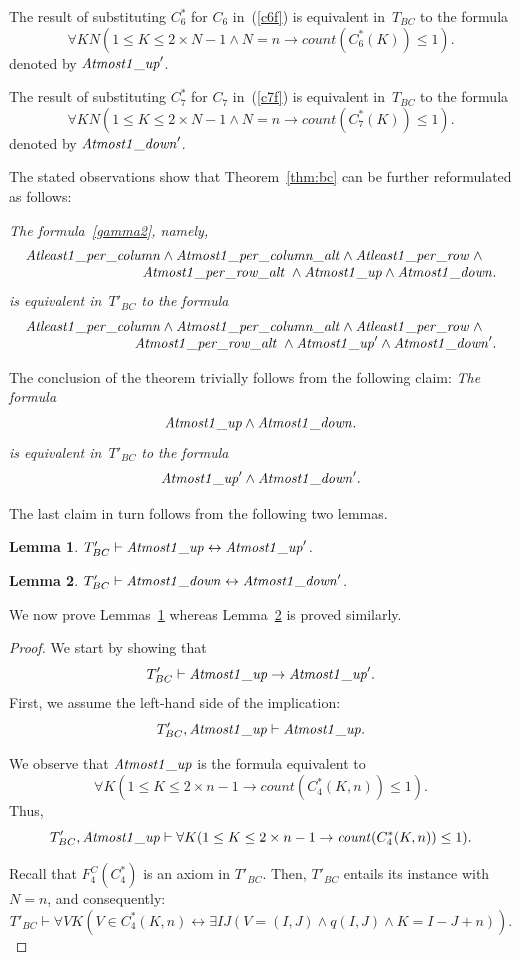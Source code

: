 \documentclass[11pt]{article}
\newtheorem{lemma}{Lemma}
\def\lrar{\leftrightarrow}
\def\beq{\begin{equation}}
\def\eeq#1{\label{#1}\end{equation}}
\def\ba{\begin{array}}
\def\ea{\end{array}}
\newcommand{\co}{\ensuremath{\mathit{count}}}
\def\bTwofgeq{\mathit{Atleast1\_per\_column\/}}
\def\bTwofleq{\mathit{Atmost1\_per\_column\_alt\/}}
\def\bThreefgeq{\mathit{Atleast1\_per\_row\/}}
\def\bThreefleq{\mathit{Atmost1\_per\_row\_alt\/}}
\def\bFourfs{\mathit{Atmost1\_up\/}}
\def\bFivefs{\mathit{Atmost1\_down\/}}
\begin{document}
\begin{adjustwidth}{-1cm}{-1cm}
The result of substituting $C_6^*$ for $C_6$ in~(\ref{c6f}) is equivalent
in~$T_{BC}$ to the formula
$$
\forall KN
(1\leq K\leq 2\times N-1 \land N=n\to\co(C^*_6(K))\leq 1).
$$
denoted by $\bFourfs'$.

The result of substituting $C_7^*$ for $C_7$ in~(\ref{c7f}) is equivalent
in~$T_{BC}$ to the formula
$$
\forall KN
(1\leq K\leq 2\times N-1
\land N=n\to
\co(C^*_7(K))\leq 1).
$$
denoted by $\bFivefs'$.


\medskip
The stated observations  show that Theorem~\ref{thm:bc} can be further
reformulated as follows:

\medskip{}
\emph{The formula~\eqref{gamma2}, namely,
$$
\ba r
\bTwofgeq\land \bTwofleq\land \bThreefgeq\;\land\quad\\
\bThreefleq\;\land\bFourfs\land \bFivefs.
\ea
$$%
is equivalent in~$T'_{BC}$ to the formula
$$
\ba r
\bTwofgeq\land \bTwofleq\land \bThreefgeq\;\land\quad\\
\bThreefleq\;\land\bFourfs'\land \bFivefs'.
\ea
$$%
}

\medskip
The conclusion of the theorem trivially follows from the following claim:
\emph{The formula
$$
\ba r
\bFourfs\land \bFivefs.
\ea
$$%
is equivalent in~$T'_{BC}$ to the formula
$$
\ba r
\bFourfs'\land \bFivefs'.
\ea
$$
}

\noindent
The last claim in turn follows from the following two lemmas.
\begin{lemma}\label{claim8}
$T'_{BC}\vdash \bFourfs \lrar  \bFourfs'$.
\end{lemma}


\begin{lemma}\label{claim9}
$T'_{BC}\vdash \bFivefs \lrar  \bFivefs'$.
\end{lemma}
We now prove Lemmas~\ref{claim8} whereas Lemma~\ref{claim9} is proved similarly.
\begin{proof}
We start by showing that
\beq
T'_{BC}\vdash  \bFourfs \to  \bFourfs'.
\eeq{eq:claim8rightdirection}
First, we assume the left-hand side of the implication:
$$T'_{BC},\bFourfs\vdash  \bFourfs.$$

We observe that $\bFourfs$ is the formula equivalent to
  $$
\forall K(1\leq K\leq 2\times n-1   \to \co(C^*_4(K,n))\leq 1).
$$
Thus,
\beq
T'_{BC},\bFourfs\vdash  \forall K(1\leq K\leq 2\times n-1   \to \co(C^*_4(K,n))\leq 1).
\eeq{eq:claim8.1}



Recall that  $F^C_4(C^*_4)$ is an axiom in $T'_{BC}$. Then, $T'_{BC}$ entails its instance with $N=n$, and consequently:
\beq
T'_{BC}\vdash \forall VK(V\in C^*_4(K,n) \lrar \exists IJ(V=(I,J) \land q(I,J)
   \land K=I-J+n)).
   \eeq{eq:claim8.2}


\end{proof}
\end{adjustwidth}
\end{document}

